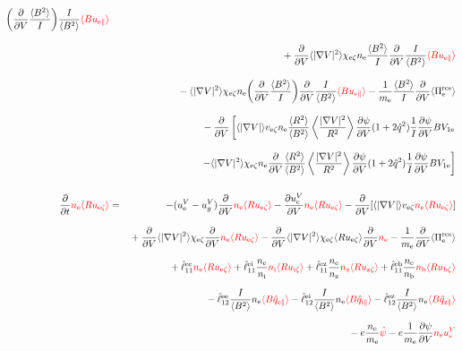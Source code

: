 \documentclass[11pt]{article}
\def\r#1{{\rm#1}}
\def\ave#1{\left\langle#1\right\rangle}
\def\aves#1{\langle#1\rangle}
\def\dd#1#2{\frac{\partial #1}{\partial #2}}
\def\para{\parallel}
\def\ddV{\frac{\partial}{\partial V}}
\def\ddt{\frac{\partial}{\partial t}}
\def\psid{\dot{\psi}}
\def\me{m_\r{e}}
\def\nee{n_\r{e}}
\def\ni{n_\r{i}}
\def\nz{n_\r{z}}
\def\nb{n_\r{b}}
\def\uzt#1{u_{\r{#1}\zeta}}
\def\upara#1{u_{\r{#1}\para}}
\def\qhatpara#1{\hat{q}_{\r{#1}\para}}
\def\uV#1{u_\r{#1}^V}
\def\ugV{u_{g}^V}
\def\chis#1{\chi_\r{#1}}
\def\red#1{\textcolor{red}{#1}}
\begin{document}
\begin{eqnarray}
  \biggl(\ddV \frac{\aves{B^2}}{I} \biggl) \frac{I}{\aves{B^2}} \red{\aves{B \upara{e}}}
\nonumber\\[3mm]&&{}
%
  + \ddV \aves{|\nabla V|^2} \chis{e\zeta} \nee
  \frac{\aves{B^2}}{I} \ddV \frac{I}{\aves{B^2}} \red{\aves{B \upara{e}}}
\nonumber\\[3mm]&&{}
%
  - \aves{|\nabla V|^2} \chis{e\zeta} \nee \biggl( \ddV
  \frac{\aves{B^2}}{I} \biggr) \ddV \frac{I}{\aves{B^2}} \red{\aves{B \upara{e}}}
%
  - \frac{1}{\me} \frac{\aves{B^2}}{I} \ddV \aves{\Pi_\r{e}^\r{res}}
\nonumber\\[3mm]&&{}
%
  - \ddV
    \left[  \aves{|\nabla V|} v_{\r{e}\zeta} \nee
            \frac{\aves{R^2}}{\aves{B^2}}\ave{\frac{|\nabla V|^2}{R^2}}\dd{\psi}{V}(1+2\hat{q}^2)
	    \frac{1}{I} \dd{\psi}{V} BV_{1\r{e}} \right.
\nonumber\\[3mm]&&{}
    \left.- \aves{|\nabla V|^2} \chis{e\zeta} \nee
          \ddV \frac{\aves{R^2}}{\aves{B^2}}\ave{\frac{|\nabla V|^2}{R^2}}\dd{\psi}{V}(1+2\hat{q}^2)
	  \frac{1}{I} \dd{\psi}{V} BV_{1\r{e}}\right]
\\[5mm]
 \ddt \red{\nee \aves{R \uzt{e}}} &=&
%
  - (\uV{e} - \ugV) \ddV \red{\nee \aves{R \uzt{e}}}
%
  - \dd{\uV{e}}{V} \red{\nee \aves{R \uzt{e}}}
%
  - \ddV [\aves{|\nabla V|} v_{\r{e}\zeta} \red{\nee \aves{R \uzt{e}}}]
\nonumber\\[3mm]&&{}
  + \ddV \aves{|\nabla V|^2} \chis{e\zeta} \ddV \red{\nee \aves{R \uzt{e}}}
  - \ddV \aves{|\nabla V|^2} \chis{e\zeta} \aves{R \uzt{e}} \ddV \red{\nee}
  - \frac{1}{\me} \ddV \aves{\Pi_\r{e}^\r{res}}
\nonumber\\[2.5mm]&&{}
%
  + \hat{\ell}_{11}^\r{ee}                  \red{\nee \aves{R \uzt{e}}}
  + \hat{\ell}_{11}^\r{ei} \frac{\nee}{\ni} \red{\ni  \aves{R \uzt{i}}}
  + \hat{\ell}_{11}^\r{ez} \frac{\nee}{\nz} \red{\nz  \aves{R \uzt{z}}}
  + \hat{\ell}_{11}^\r{eb} \frac{\nee}{\nb} \red{\nb  \aves{R \uzt{b}}}
\nonumber\\[2.5mm]&&{}
%
  - \hat{\ell}_{12}^\r{ee} \frac{I}{\aves{B^2}} \nee \red{\aves{B \qhatpara{e}}}
  - \hat{\ell}_{12}^\r{ei} \frac{I}{\aves{B^2}} \nee \red{\aves{B \qhatpara{i}}}
  - \hat{\ell}_{12}^\r{ez} \frac{I}{\aves{B^2}} \nee \red{\aves{B \qhatpara{z}}}
\nonumber\\[2.5mm]&&{}
%
  - e \frac{\nee}{\me} \red{\psid}
%
  - e \frac{1}{\me} \dd{\psi}{V} \red{\nee \uV{e}}
%
\nonumber\\[2.5mm]&&{}

\end{eqnarray}
\end{document}
